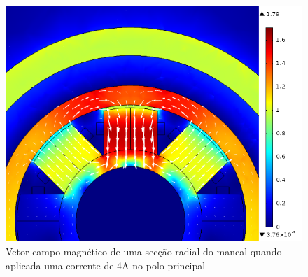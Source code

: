 \begin{figure}
\centering
\includegraphics[width=0.8\linewidth]{Figs/Simulacoes/Ativo/Cima_dx=03_I=4}
\caption{Vetor campo magnético de uma secção radial do mancal quando aplicada uma corrente de 4A no polo principal}
\label{fig:ativo:fem:b:radial}
\end{figure}



